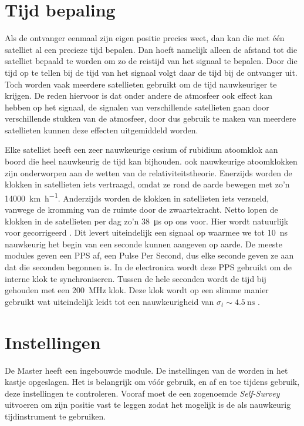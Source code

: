 \section{Tijd bepaling}

Als de ontvanger eenmaal zijn eigen positie precies weet, dan kan die
met één satelliet al een precieze tijd bepalen. Dan hoeft namelijk
alleen de afstand tot die satelliet bepaald te worden om zo de reistijd
van het signaal te bepalen. Door die tijd op te tellen bij de tijd van
het signaal volgt daar de tijd bij de ontvanger uit. Toch worden vaak
meerdere satellieten gebruikt om de tijd nauwkeuriger te krijgen. De
reden hiervoor is dat onder andere de atmosfeer ook effect kan hebben op
het signaal, de signalen van verschillende satellieten gaan door
verschillende stukken van de atmosfeer, door dus gebruik te maken van
meerdere satellieten kunnen deze effecten uitgemiddeld worden.

Elke \gps satelliet heeft een zeer nauwkeurige cesium of rubidium
atoomklok aan boord die heel nauwkeurig de tijd kan bijhouden. ook nauwkeurige atoomklokken zijn onderworpen aan de wetten van de relativiteitstheorie. Enerzijds worden de klokken in \gps satellieten iets vertraagd, omdat ze rond de aarde bewegen met zo'n
\SI{14000}{\kilo\meter\per\hour}. Anderzijds worden de klokken in \gps satellieten iets versneld, vanwege de kromming van de ruimte
door de zwaartekracht. Netto lopen de klokken in de \gps satellieten per dag zo'n \SI{38}{\micro\second} op ons
voor. Hier wordt natuurlijk voor gecorrigeerd \cite{ashby1997gen}.
Dit levert uiteindelijk een signaal op waarmee we tot
\SI{10}{\nano\second} nauwkeurig het begin van een seconde kunnen
aangeven op aarde. De meeste \gps modules geven een PPS af, een Pulse
Per Second, dus elke seconde geven ze aan dat die seconden begonnen is.
In de \hisparc electronica wordt deze PPS gebruikt om de interne klok te
synchroniseren. Tussen de hele seconden wordt de tijd bij gehouden met
een \SI{200}{\mega\hertz} klok. Deze klok wordt op een slimme manier
gebruikt wat uiteindelijk leidt tot een nauwkeurigheid van
$\sigma_t\sim\SI{4.5}{\nano\second}$ \cite{trimble2007res}.


\section{Instellingen}

De \hisparc Master heeft een ingebouwde \gps module. De instellingen van
de \gps worden in het kastje opgeslagen. Het is belangrijk om vóór gebruik, en af
en toe tijdens gebruik, deze instellingen te controleren. Vooraf moet de
\gps een zogenoemde \emph{Self-Survey} uitvoeren om zijn positie vast te
leggen zodat het mogelijk is de \gps als nauwkeurig tijdinstrument te
gebruiken.

